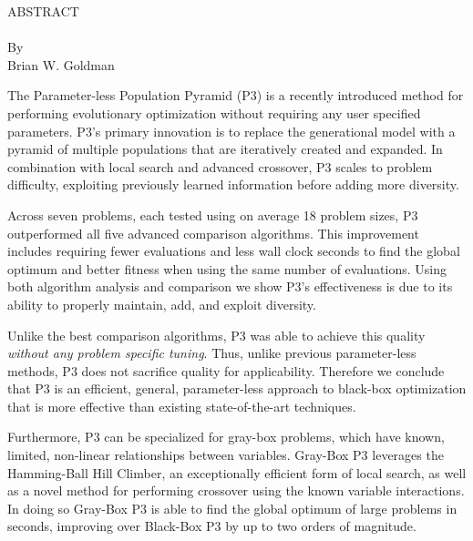 \thispagestyle{empty} \setcounter{page}{2}
\begin{doublespace}
\begin{centering}
ABSTRACT\\ %
\MyTitle\\ %
By \\ %
Brian W. Goldman\\ %
\end{centering}

The Parameter-less Population Pyramid (P3) is a recently introduced method for performing
evolutionary optimization without requiring any user specified parameters.
P3's primary innovation is to replace the generational model with a pyramid of
multiple populations that are iteratively created and expanded. In combination
with local search and advanced crossover,
P3 scales to problem difficulty, exploiting
previously learned information before adding more diversity.

Across seven problems, each tested using on average 18 problem sizes, P3 outperformed
all five advanced comparison algorithms. This improvement includes requiring fewer evaluations
and less wall clock seconds to find the global optimum and better fitness when using
the same number of evaluations. Using both algorithm analysis and comparison we show P3's
effectiveness is due to its ability to properly maintain, add, and exploit diversity.

Unlike the best comparison algorithms, P3 was able to achieve this quality
\textit{without any
problem specific tuning}. Thus, unlike previous parameter-less methods, P3 does not
sacrifice quality for applicability. Therefore we conclude that
P3 is an efficient, general, parameter-less approach to black-box
optimization that is more effective than existing state-of-the-art techniques.

Furthermore, P3 can be specialized for gray-box problems, which have
known, limited, non-linear relationships
between variables.
Gray-Box P3 leverages the Hamming-Ball Hill Climber, an exceptionally efficient
form of local search, as well as a novel method for performing crossover using the
known variable interactions. In doing so Gray-Box P3 is able to find the global
optimum of large problems in seconds, improving over Black-Box P3 by up to
two orders of magnitude.
\end{doublespace}
\newpage
